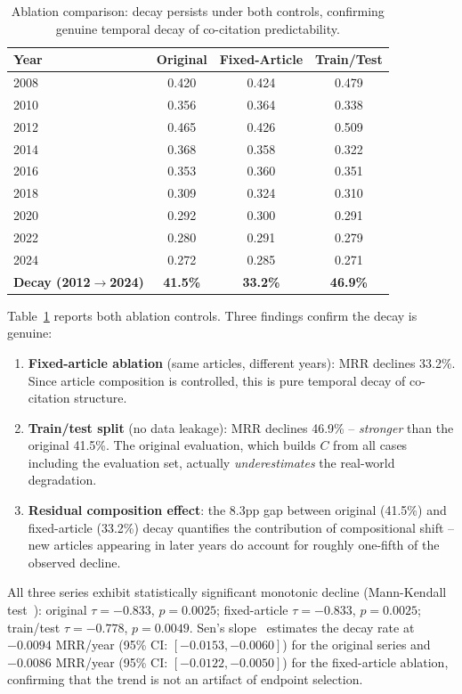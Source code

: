 \documentclass[11pt]{article}
\begin{document}
\begin{table}[t]
\centering
\small
\caption{Ablation comparison: decay persists under both controls, confirming genuine temporal decay of co-citation predictability.}
\label{tab:ablation}
\begin{tabular}{@{}l ccc@{}}
\toprule
\textbf{Year} & \textbf{Original} & \textbf{Fixed-Article} & \textbf{Train/Test} \\
\midrule
2008 & 0.420 & 0.424 & 0.479 \\
2010 & 0.356 & 0.364 & 0.338 \\
2012 & 0.465 & 0.426 & 0.509 \\
2014 & 0.368 & 0.358 & 0.322 \\
2016 & 0.353 & 0.360 & 0.351 \\
2018 & 0.309 & 0.324 & 0.310 \\
2020 & 0.292 & 0.300 & 0.291 \\
2022 & 0.280 & 0.291 & 0.279 \\
2024 & 0.272 & 0.285 & 0.271 \\
\midrule
\textbf{Decay (2012$\to$2024)} & \textbf{41.5\%} & \textbf{33.2\%} & \textbf{46.9\%} \\
\bottomrule
\end{tabular}
\end{table}

Table~\ref{tab:ablation} reports both ablation controls.
Three findings confirm the decay is genuine:

\begin{enumerate}[nosep,leftmargin=*]
  \item \textbf{Fixed-article ablation} (same articles, different years): MRR declines 33.2\%. Since article composition is controlled, this is pure temporal decay of co-citation structure.
  \item \textbf{Train/test split} (no data leakage): MRR declines 46.9\% -- \emph{stronger} than the original 41.5\%. The original evaluation, which builds $C$ from all cases including the evaluation set, actually \emph{underestimates} the real-world degradation.
  \item \textbf{Residual composition effect}: the 8.3pp gap between original (41.5\%) and fixed-article (33.2\%) decay quantifies the contribution of compositional shift -- new articles appearing in later years do account for roughly one-fifth of the observed decline.
\end{enumerate}

All three series exhibit statistically significant monotonic decline (Mann-Kendall test~\citep{mann1945nonparametric}): original $\tau = -0.833$, $p = 0.0025$; fixed-article $\tau = -0.833$, $p = 0.0025$; train/test $\tau = -0.778$, $p = 0.0049$.
Sen's slope~\citep{sen1968estimates} estimates the decay rate at $-0.0094$ MRR/year (95\% CI: $[-0.0153, -0.0060]$) for the original series and $-0.0086$ MRR/year (95\% CI: $[-0.0122, -0.0050]$) for the fixed-article ablation, confirming that the trend is not an artifact of endpoint selection.
\end{document}
